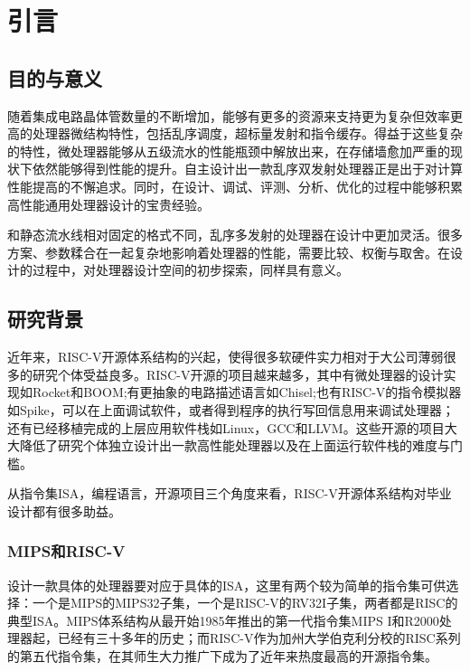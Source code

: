 \chapter{引言}\label{chap:introduction}

\section{目的与意义}

随着集成电路晶体管数量的不断增加，能够有更多的资源来支持更为复杂但效率更高的处理器微结构特性，包括乱序调度，超标量发射和指令缓存。得益于这些复杂的特性，微处理器能够从五级流水的性能瓶颈中解放出来，在存储墙愈加严重的现状下依然能够得到性能的提升。自主设计出一款乱序双发射处理器正是出于对计算性能提高的不懈追求。同时，在设计、调试、评测、分析、优化的过程中能够积累高性能通用处理器设计的宝贵经验。

和静态流水线相对固定的格式不同，乱序多发射的处理器在设计中更加灵活。很多方案、参数糅合在一起复杂地影响着处理器的性能，需要比较、权衡与取舍。在设计的过程中，对处理器设计空间的初步探索，同样具有意义。

\section{研究背景}

近年来，RISC-V开源体系结构的兴起，使得很多软硬件实力相对于大公司薄弱很多的研究个体受益良多。RISC-V开源的项目越来越多，其中有微处理器的设计实现如Rocket和BOOM;有更抽象的电路描述语言如Chisel;也有RISC-V的指令模拟器如Spike，可以在上面调试软件，或者得到程序的执行写回信息用来调试处理器；还有已经移植完成的上层应用软件栈如Linux，GCC和LLVM。这些开源的项目大大降低了研究个体独立设计出一款高性能处理器以及在上面运行软件栈的难度与门槛。

从指令集ISA，编程语言，开源项目三个角度来看，RISC-V开源体系结构对毕业设计都有很多助益。

\subsection{MIPS和RISC-V}\label{subsec:ISA}
设计一款具体的处理器要对应于具体的ISA，这里有两个较为简单的指令集可供选择：一个是MIPS的MIPS32子集，一个是RISC-V的RV32I子集，两者都是RISC的典型ISA。MIPS体系结构从最开始1985年推出的第一代指令集MIPS I和R2000处理器起，已经有三十多年的历史；而RISC-V作为加州大学伯克利分校的RISC系列的第五代指令集，在其师生大力推广下成为了近年来热度最高的开源指令集。

